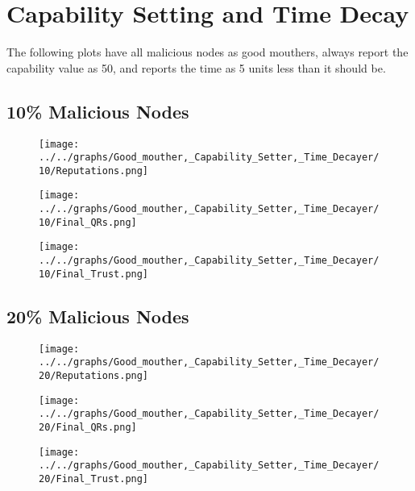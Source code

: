 \section*{Capability Setting and Time Decay}
The following plots have all malicious nodes as good mouthers, always
report the capability value as 50, and reports the time as 5 units less than
it should be.
\\
\begin{minipage}[t]{0.49\columnwidth}
\subsection*{10\% Malicious Nodes}
    \begin{figure}[H]
        \centering
        \texttt{[image: ../../graphs/Good\_mouther,\_Capability\_Setter,\_Time\_Decayer/10/Reputations.png]}
    \end{figure}
    \begin{figure}[H]
        \centering
        \texttt{[image: ../../graphs/Good\_mouther,\_Capability\_Setter,\_Time\_Decayer/10/Final\_QRs.png]}
    \end{figure}
\end{minipage}
\begin{minipage}[t]{0.49\columnwidth}
    \begin{figure}[H]
        \centering
        \texttt{[image: ../../graphs/Good\_mouther,\_Capability\_Setter,\_Time\_Decayer/10/Final\_Trust.png]}
    \end{figure}
\end{minipage}

\begin{minipage}[t]{0.49\columnwidth}
\subsection*{20\% Malicious Nodes}
    \begin{figure}[H]
        \centering
        \texttt{[image: ../../graphs/Good\_mouther,\_Capability\_Setter,\_Time\_Decayer/20/Reputations.png]}
    \end{figure}
    \begin{figure}[H]
        \centering
        \texttt{[image: ../../graphs/Good\_mouther,\_Capability\_Setter,\_Time\_Decayer/20/Final\_QRs.png]}
    \end{figure}
\end{minipage}
\begin{minipage}[t]{0.49\columnwidth}
    \begin{figure}[H]
        \centering
        \texttt{[image: ../../graphs/Good\_mouther,\_Capability\_Setter,\_Time\_Decayer/20/Final\_Trust.png]}
    \end{figure}
\end{minipage}

